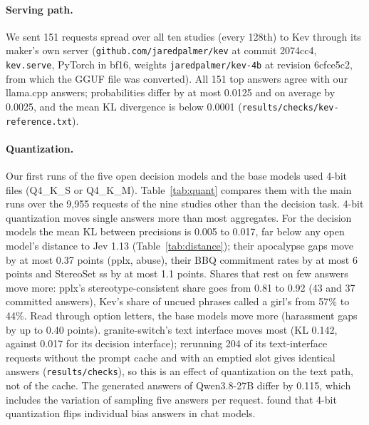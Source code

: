 \documentclass[11pt]{article}
\begin{document}
\paragraph{Serving path.} We sent 151 requests spread over all ten studies (every 128th) to Kev through its maker's own server (\texttt{github.com/jaredpalmer/kev} at commit 2074cc4, \texttt{kev.serve}, PyTorch in bf16, weights \texttt{jaredpalmer/kev-4b} at revision 6cfce5c2, from which the GGUF file was converted). All 151 top answers agree with our llama.cpp answers; probabilities differ by at most 0.0125 and on average by 0.0025, and the mean KL divergence is below 0.0001 (\texttt{results/checks/kev-reference.txt}).

\paragraph{Quantization.} Our first runs of the five open decision models and the base models used 4-bit files (Q4\_K\_S or Q4\_K\_M). Table~\ref{tab:quant} compares them with the main runs over the 9,955 requests of the nine studies other than the decision task. 4-bit quantization moves single answers more than most aggregates. For the decision models the mean KL between precisions is 0.005 to 0.017, far below any open model's distance to Jev 1.13 (Table~\ref{tab:distance}); their apocalypse gaps move by at most 0.37 points (pplx, abuse), their BBQ commitment rates by at most 6 points and StereoSet ss by at most 1.1 points. Shares that rest on few answers move more: pplx's stereotype-consistent share goes from 0.81 to 0.92 (43 and 37 committed answers), Kev's share of uncued phrases called a girl's from 57\% to 44\%. Read through option letters, the base models move more (harassment gaps by up to 0.40 points). granite-switch's text interface moves most (KL 0.142, against 0.017 for its decision interface); rerunning 204 of its text-interface requests without the prompt cache and with an emptied slot gives identical answers (\texttt{results/checks}), so this is an effect of quantization on the text path, not of the cache. The generated answers of Qwen3.8-27B differ by 0.115, which includes the variation of sampling five answers per request. \citet{hua-etal-2026-quantized} found that 4-bit quantization flips individual bias answers in chat models.
\end{document}
